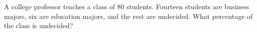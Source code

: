 A college professor teaches a class of $80$ students. Fourteen students are business majors, six are education majors, and the rest are undecided. What percentage of the class is undecided?
